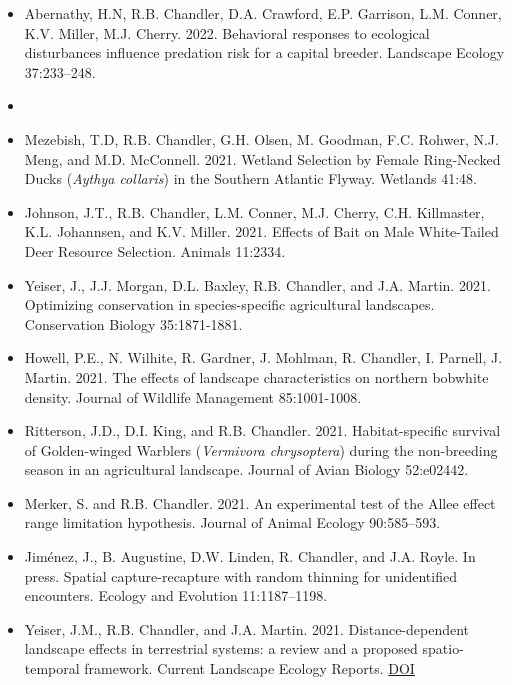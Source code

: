 \documentclass[12pt]{article}
\begin{document}
\begin{itemize}
\item Abernathy, H.N, R.B. Chandler, D.A. Crawford, E.P. Garrison,
  L.M. Conner, K.V. Miller, M.J. Cherry. 2022. Behavioral
  responses to ecological disturbances influence predation risk for a
  capital breeder. Landscape Ecology 37:233--248.

\item[] { \\}

\item Mezebish, T.D, R.B. Chandler, G.H. Olsen, M. Goodman,
  F.C. Rohwer, N.J. Meng, and M.D. McConnell. 2021. Wetland Selection
  by Female Ring-Necked Ducks ({\it Aythya collaris}) in the Southern
  Atlantic Flyway. Wetlands 41:48.

\item Johnson, J.T., R.B. Chandler, L.M. Conner, M.J. Cherry,
  C.H. Killmaster, K.L. Johannsen, and K.V. Miller. 2021. Effects of
  Bait on Male White-Tailed Deer Resource Selection. Animals 11:2334. 
  
\item Yeiser, J., J.J. Morgan, D.L. Baxley, R.B. Chandler, and
  J.A. Martin. 2021. Optimizing conservation in species-specific
  agricultural landscapes. Conservation Biology 35:1871-1881. 

\item Howell, P.E., N. Wilhite, R. Gardner, J. Mohlman, R. Chandler,
  I. Parnell, J. Martin. 2021. The effects of landscape
  characteristics on northern bobwhite density. Journal of Wildlife
  Management 85:1001-1008. 

\item Ritterson, J.D., D.I. King, and
  R.B. Chandler. 2021. Habitat-specific survival of Golden-winged
  Warblers ({\it Vermivora chrysoptera}) during the non-breeding
  season in an agricultural landscape. Journal of Avian Biology
  52:e02442.  
  
\item Merker, S. and R.B. Chandler. 2021. An experimental test of 
  the Allee effect range limitation hypothesis. Journal of Animal
  Ecology 90:585--593. 

\item Jim\'enez, J., B. Augustine, D.W. Linden, R. Chandler, and
  J.A. Royle. In press. Spatial capture-recapture with random thinning
  for unidentified encounters. Ecology and Evolution 11:1187--1198.

\item Yeiser, J.M., R.B. Chandler, and
  J.A. Martin. 2021. Distance-dependent landscape effects in
  terrestrial systems: a review and a proposed spatio-temporal
  framework. Current Landscape Ecology
  Reports. \href{https://doi.org/10.1007/s40823-020-00061-w}{DOI}


\end{itemize}
\end{document}

